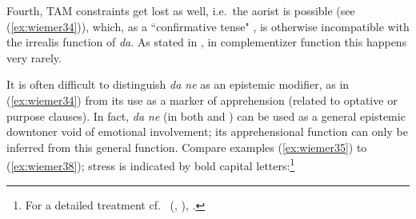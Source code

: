 \documentclass[output=paper,colorlinks,citecolor=brown]{langscibook}
\begin{document}
\noindent Fourth, TAM constraints get lost as well, i.e.\ the aorist is possible (see (\ref{ex:wiemer34})), which, as a ``confirmative tense" \citep{Friedman2000}, is otherwise incompatible with the irrealis function of \textit{da}. As stated in , in complementizer function this happens very rarely.

It is often difficult to distinguish \textit{da ne} as an epistemic modifier, as in (\ref{ex:wiemer34}) from its use as a marker of apprehension (related to optative or purpose clauses). In fact, \textit{da ne} (in both  and ) can be used as a general epistemic downtoner void of emotional involvement; its apprehensional function can only be inferred from this general function. Compare examples  (\ref{ex:wiemer35}) to (\ref{ex:wiemer38}); stress is indicated by bold capital letters:\footnote{For a detailed treatment cf.\ \citeauthor{Mitkovska2015} (\citeyear[37 et passim]{Mitkovska2015}, \citeyear{MitkovskaEtAl2017}), \citet[67--70]{MitkovskaEtAl2017}.}
\end{document}
